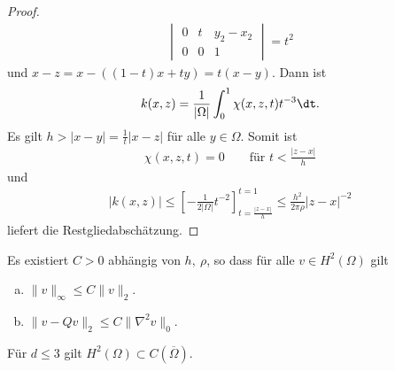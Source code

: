 \begin{proof}
\begin{eqnarray*}
\begin{vmatrix}
              0 & t & y_2 - x_2 \\
              0 & 0 & 1
          \end{vmatrix}
        = t^2
    \end{eqnarray*}
    und $x - z = x - ((1-t) x + ty) = t (x-y)$. Dann ist
    \begin{eqnarray*}
        k(x, z) = \frac{1}{|\Omega|} \int_0^1 \chi(x, z, t) t^{-3} \dt.
    \end{eqnarray*}
    Es gilt $h > |x-y| = \frac{1}{t} |x-z|$ für alle $y\in \Omega$.
    Somit ist
    \begin{eqnarray*}
        \chi(x, z, t) = 0 \qquad \text{für } t < \frac{|z-x|}{h}
    \end{eqnarray*}
    und
    \begin{eqnarray*}
            |k(x, z)|
        \le \left[-\frac{1}{2 |\Omega|} t^{-2}\right]_{t=\frac{|z-x|}{h}}^{t=1}
        \le \frac{h^2}{2 \pi \rho} |z-x|^{-2}
    \end{eqnarray*}
    liefert die Restgliedabschätzung.
\end{proof}


\begin{Satz}
    \label{satz:3.15}
    Es existiert $C > 0$ abhängig von $h, \ \rho$, so dass für alle $v\in
    H^2(\Omega)$ gilt
    \begin{enumerate}[a)]
      \item
        $\|v\|_\infty \le C \|v\|_2$.
      \item
        $\|v - Qv\|_2 \le C \|\nabla^2 v\|_0$.
    \end{enumerate}
\end{Satz}


\begin{Bemerkung}
    Für $d \le 3$ gilt $H^2(\Omega) \subset C\left(\overline\Omega\right)$.
\end{Bemerkung}


